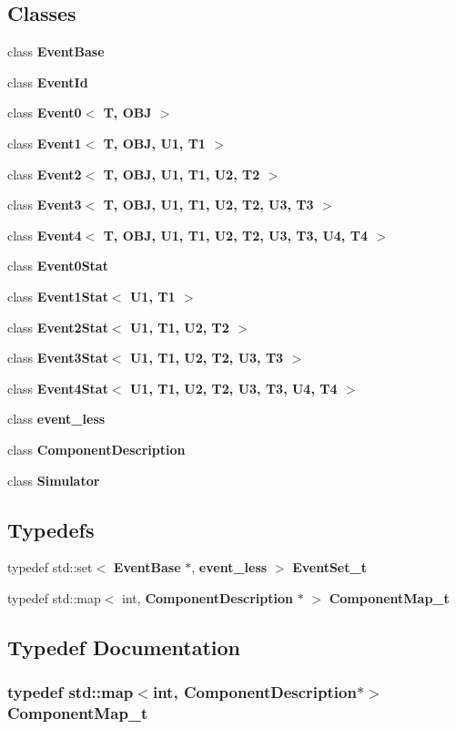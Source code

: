 \subsection*{Classes}
\begin{CompactItemize}
\item 
class {\bf EventBase}
\item 
class {\bf EventId}
\item 
class {\bf Event0$<$ T, OBJ $>$}
\item 
class {\bf Event1$<$ T, OBJ, U1, T1 $>$}
\item 
class {\bf Event2$<$ T, OBJ, U1, T1, U2, T2 $>$}
\item 
class {\bf Event3$<$ T, OBJ, U1, T1, U2, T2, U3, T3 $>$}
\item 
class {\bf Event4$<$ T, OBJ, U1, T1, U2, T2, U3, T3, U4, T4 $>$}
\item 
class {\bf Event0Stat}
\item 
class {\bf Event1Stat$<$ U1, T1 $>$}
\item 
class {\bf Event2Stat$<$ U1, T1, U2, T2 $>$}
\item 
class {\bf Event3Stat$<$ U1, T1, U2, T2, U3, T3 $>$}
\item 
class {\bf Event4Stat$<$ U1, T1, U2, T2, U3, T3, U4, T4 $>$}
\item 
class {\bf event\_\-less}
\item 
class {\bf ComponentDescription}
\item 
class {\bf Simulator}
\end{CompactItemize}
\subsection*{Typedefs}
\begin{CompactItemize}
\item 
typedef std::set$<$ {\bf EventBase} $\ast$, {\bf event\_\-less} $>$ {\bf EventSet\_\-t}
\item 
typedef std::map$<$ int, {\bf ComponentDescription} $\ast$ $>$ {\bf ComponentMap\_\-t}
\end{CompactItemize}


\subsection{Typedef Documentation}
\subsubsection[{ComponentMap\_\-t}]{\setlength{\rightskip}{0pt plus 5cm}typedef std::map$<$int, {\bf ComponentDescription}$\ast$$>$ {\bf ComponentMap\_\-t}}\label{simulator_8h_4dc8b9729445847e674fbfebf12d6c7e}




